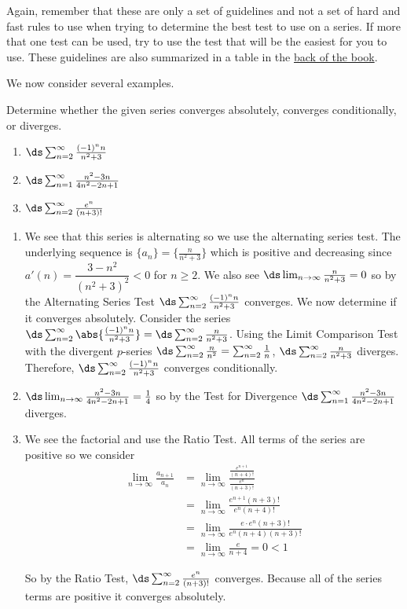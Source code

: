 Again, remember that these are only a set of guidelines and not a set of hard and fast rules to use when trying to determine the best test to use on a series. If more that one test can be used, try to use the test that will be the easiest for you to use.  These guidelines are also summarized in a table in the \hyperref[tab_series_tests]{back of the book}.

We now consider several examples.

\begin{example}\label{eg_strat_test}
Determine whether the given series converges absolutely, converges conditionally, or diverges.
\begin{enumerate}
\item $\ds \sum_{n=2}^{\infty} \frac{(-1)^nn}{n^2+3}$
\item $\ds \sum_{n=1}^{\infty} \frac{n^2-3n}{4n^2-2n+1}$
\item $\ds \sum_{n=2}^{\infty} \frac{e^n}{(n+3)!}$
\end{enumerate}
\solution
\begin{enumerate}
\item We see that this series is alternating so we use the alternating series test. The underlying sequence is $\{a_n\}=\{\frac{n}{n^2+3}\}$ which is positive and decreasing since $a'(n)=\dfrac{3-n^2}{(n^2+3)^2}<0$ for $n\geq 2$. We also see $\ds \lim_{n\to \infty}\frac{n}{n^2+3}=0$ so by the Alternating Series Test $\ds \sum_{n=2}^{\infty} \frac{(-1)^nn}{n^2+3}$ converges. We now determine if it converges absolutely. Consider the series $\ds \sum_{n=2}^{\infty} \abs{\frac{(-1)^nn}{n^2+3}}=\ds \sum_{n=2}^{\infty} \frac{n}{n^2+3}$. Using the Limit Comparison Test with the divergent $p$-series $\ds \sum_{n=2}^{\infty} \frac{n}{n^2}=\sum_{n=2}^{\infty} \frac{1}{n}$, $\ds \sum_{n=2}^{\infty} \frac{n}{n^2+3}$ diverges. Therefore,  $\ds \sum_{n=2}^{\infty} \frac{(-1)^nn}{n^2+3}$ converges conditionally.

\item $\ds \lim_{n\to\infty} \frac{n^2-3n}{4n^2-2n+1}=\frac{1}{4}$ so by the Test for Divergence $\ds \sum_{n=1}^{\infty} \frac{n^2-3n}{4n^2-2n+1}$ diverges.

\item We see the factorial and use the Ratio Test. All terms of the series are positive so we consider 
\begin{align*}
\lim_{n\to\infty} \frac{a_{n+1}}{a_n}&=\lim_{n\to\infty} \frac{\frac{e^{n+1}}{(n+4)!}}{\frac{e^{n}}{(n+3)!}}\\
&=\lim_{n\to\infty}\frac{e^{n+1}(n+3)!}{e^n(n+4)!}\\
&=\lim_{n\to\infty}\frac{e\cdot e^n(n+3)!}{e^n(n+4)(n+3)!}\\
&=\lim_{n\to\infty}\frac{e}{n+4}=0<1
\end{align*}

So by the Ratio Test, $\ds \sum_{n=2}^{\infty} \frac{e^n}{(n+3)!}$ converges. Because all of the series terms are positive it converges absolutely.

\end{enumerate}
\end{example}

